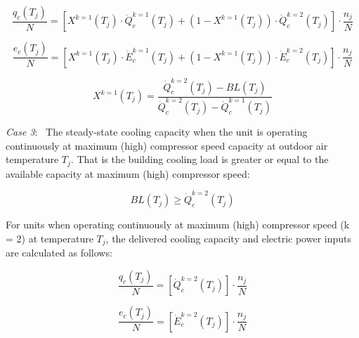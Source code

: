 \begin{equation}
  \frac{{{q_c}({T_j})}}{N} = \left[ {{X^{k = 1}}({T_j}) \cdot \dot Q_c^{k = 1}({T_j}) + \left( {1 - {X^{k = 1}}({T_j})} \right) \cdot \dot Q_c^{k = 2}({T_j})} \right] \cdot \frac{{{n_j}}}{N}
\end{equation}

\begin{equation}
  \frac{{{e_c}({T_j})}}{N} = \left[ {{X^{k = 1}}({T_j}) \cdot \dot E_c^{k = 1}({T_j}) + \left( {1 - {X^{k = 1}}({T_j})} \right) \cdot \dot E_c^{k = 2}({T_j})} \right] \cdot \frac{{{n_j}}}{N}
\end{equation}

\begin{equation}
{X^{k = 1}}({T_j}) = \frac{{\dot Q_c^{k = 2}({T_j}) - BL({T_j})}}{{\dot Q_c^{k = 2}({T_j}) - \dot Q_c^{k = 1}({T_j})}}
\end{equation}

\emph{Case 3}:~ The steady-state cooling capacity when the unit is operating continuously at maximum (high) compressor speed capacity at outdoor air temperature \(T_{j}\). That is the building cooling load is greater or equal to the available capacity at maximum (high) compressor speed:

\begin{equation}
BL({T_j}) \ge \dot Q_c^{k = 2}({T_j})
\end{equation}

For units when operating continuously at maximum (high) compressor speed (k = 2) at temperature \(T_{j}\), the delivered cooling capacity and electric power inputs are calculated as follows:

\begin{equation}
\frac{{{q_c}({T_j})}}{N} = \left[ {\dot Q_c^{k = 2}({T_j})} \right] \cdot \frac{{{n_j}}}{N}
\end{equation}

\begin{equation}
\frac{{{e_c}({T_j})}}{N} = \left[ {\dot E_c^{k = 2}({T_j})} \right] \cdot \frac{{{n_j}}}{N}
\end{equation}

